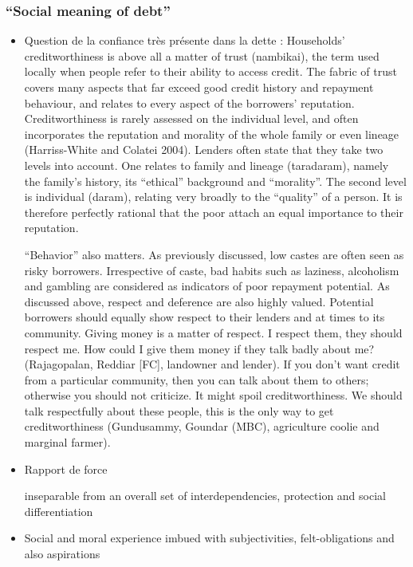 \documentclass[a4paper, 11pt, onecolumn]{article}
\begin{document}
	\subsubsection{``Social meaning of debt''}
\begin{itemize}
\item Question de la confiance très présente dans la dette :
\cite{Guerin2014a} Households’ creditworthiness is above all a matter of trust (nambikai), the term used locally
when people refer to their ability to access credit. The fabric of trust covers many aspects that
far exceed good credit history and repayment behaviour, and relates to every aspect of the
borrowers’ reputation. Creditworthiness is rarely assessed on the individual level, and often
incorporates the reputation and morality of the whole family or even lineage (Harriss-White
and Colatei 2004). Lenders often state that they take two levels into account. One relates to
family and lineage (taradaram), namely the family’s history, its “ethical” background and
“morality”. The second level is individual (daram), relating very broadly to the “quality” of a
person. It is therefore perfectly rational that the poor attach an equal importance to their
reputation.

“Behavior” also matters. As previously discussed, low castes are often seen as risky
borrowers. Irrespective of caste, bad habits such as laziness, alcoholism and gambling are
considered as indicators of poor repayment potential. As discussed above, respect and deference are also highly valued. Potential borrowers should equally show respect to their
lenders and at times to its community.
Giving money is a matter of respect. I respect them, they should respect me. How could I give them
money if they talk badly about me? (Rajagopalan, Reddiar [FC], landowner and lender).
If you don’t want credit from a particular community, then you can talk about them to others; otherwise
you should not criticize. It might spoil creditworthiness. We should talk respectfully about these people,
this is the only way to get creditworthiness (Gundusammy, Goundar (MBC), agriculture coolie and
marginal farmer).

\item Rapport de force
\cite{Guerin2014}

\citep{Guerin2020a}
inseparable from an overall set of interdependencies, protection and social differentiation

\item Social and moral experience
imbued with subjectivities, felt-obligations and also aspirations


\end{itemize}
\end{document}
